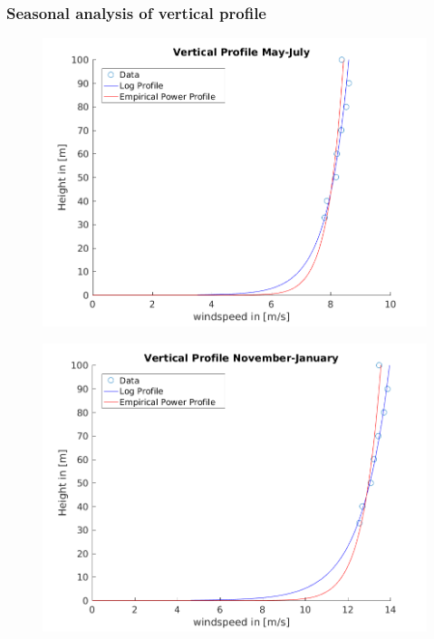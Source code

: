 \documentclass[12pt,t]{beamer}
\begin{document}
\begin{frame}[fragile]
\frametitle{Seasonal analysis of vertical profile}
\begin{figure}[htbp]
	\begin{center}
		\begin{minipage}[t]{0.49\linewidth}
			\centering
  \includegraphics[width=1\linewidth]{../../figures/verticalProfileFitsSommer.png}
			\label{histo1}
		\end{minipage}
		\begin{minipage}[t]{0.49\linewidth}
		  \centering
  \includegraphics[width=1\linewidth]{../../figures/verticalProfileFitsWinter.png}
			\label{histo2}
		\end{minipage}
	\end{center}
\end{figure}
\end{frame}
\end{document}
